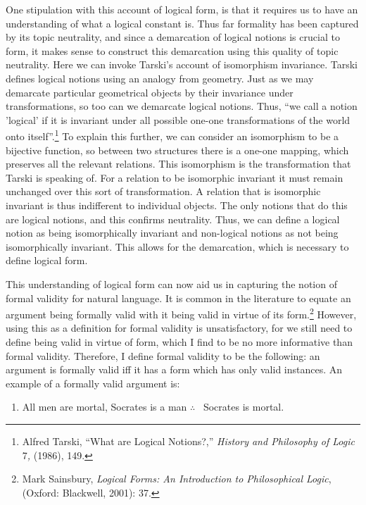 One stipulation with this account of logical form, is that it requires
us to have an understanding of what a logical constant is. Thus far
formality has been captured by its topic neutrality, and since a
demarcation of logical notions is crucial to form, it makes sense to
construct this demarcation using this quality of topic neutrality. Here
we can invoke Tarski's account of isomorphism invariance. Tarski defines
logical notions using an analogy from geometry. Just as we may demarcate
particular geometrical objects by their invariance under
transformations, so too can we demarcate logical notions. Thus, ``we
call a notion 'logical' if it is invariant under all possible one-one
transformations of the world onto itself''.\footnote{Alfred Tarski,
  ``What are Logical Notions?,'' \emph{History and Philosophy of Logic}
  7\emph{,} (1986), 149.} To explain this further, we can consider an
isomorphism to be a bijective function, so between two structures there
is a one-one mapping, which preserves all the relevant relations. This
isomorphism is the transformation that Tarski is speaking of. For a
relation to be isomorphic invariant it must remain unchanged over this
sort of transformation. A relation that is isomorphic invariant is thus
indifferent to individual objects. The only notions that do this are
logical notions, and this confirms neutrality. Thus, we can define a
logical notion as being isomorphically invariant and non-logical notions
as not being isomorphically invariant. This allows for the demarcation,
which is necessary to define logical form.

This understanding of logical form can now aid us in capturing the
notion of formal validity for natural language. It is common in the
literature to equate an argument being formally valid with it being
valid in virtue of its form.\footnote{Mark Sainsbury, \emph{Logical
  Forms: An Introduction to Philosophical Logic}, (Oxford: Blackwell,
  2001): 37.} However, using this as a definition for formal validity is
unsatisfactory, for we still need to define being valid in virtue of
form, which I find to be no more informative than formal validity.
Therefore, I define formal validity to be the following: an argument is
formally valid iff it has a form which has only valid instances. An
example of a formally valid argument is:

\begin{enumerate}[leftmargin=42pt] 
\def\labelenumi{(\arabic{enumi})}
\setcounter{enumi}{2}
\item
  All men are mortal, Socrates is a man $\therefore$ \ Socrates is mortal.
\end{enumerate} 

